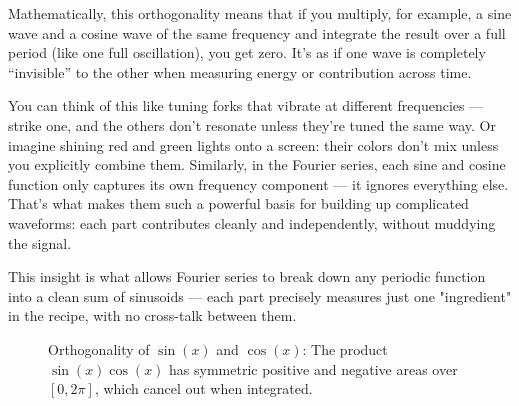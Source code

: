 Mathematically, this orthogonality means that if you multiply, for example, a sine wave and a cosine wave of the same frequency and integrate the result over a full period (like one full oscillation), you get zero. It’s as if one wave is completely “invisible” to the other when measuring energy or contribution across time.

You can think of this like tuning forks that vibrate at different frequencies — strike one, and the others don’t resonate unless they’re tuned the same way. Or imagine shining red and green lights onto a screen: their colors don’t mix unless you explicitly combine them. Similarly, in the Fourier series, each sine and cosine function only captures its own frequency component — it ignores everything else. That’s what makes them such a powerful basis for building up complicated waveforms: each part contributes cleanly and independently, without muddying the signal.

This insight is what allows Fourier series to break down any periodic function into a clean sum of sinusoids — each part precisely measures just one "ingredient" in the recipe, with no cross-talk between them.

\begin{figure}[H]
    \centering
    \caption{Orthogonality of $\sin(x)$ and $\cos(x)$: The product $\sin(x)\cos(x)$ has symmetric positive and negative areas over $[0, 2\pi]$, which cancel out when integrated.}
    \label{fig:sin_cos_cancellation}
\end{figure}



